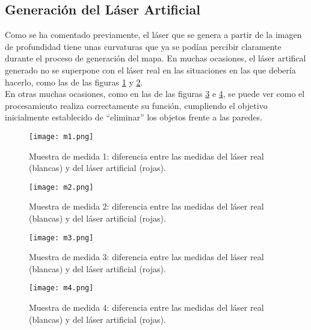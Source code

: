 \subsection{Generación del Láser Artificial}

Como se ha comentado previamente, el láser que se genera a partir de la imagen de profundidad tiene unas curvaturas que ya se podían percibir claramente durante el proceso de generación del mapa. En muchas ocasiones, el láser artifical generado no se superpone con el láser real en las situaciones en las que debería hacerlo, como las de las figuras \ref{fig:m1} y \ref{fig:m2}.\\

En otras muchas ocasiones, como en las de las figuras \ref{fig:m3} e \ref{fig:m4}, se puede ver como el procesamiento realiza correctamente su función, cumpliendo el objetivo inicialmente establecido de ``eliminar'' los objetos frente a las paredes.\\

\begin{figure}[H]
	\begin{center} 
		\texttt{[image: m1.png]}
	\end{center}
	\caption{Muestra de medida 1: diferencia entre las medidas del láser real (blancas) y del láser artificial (rojas).}
	\label{fig:m1}
\end{figure}

\begin{figure}[H]
	\begin{center} 
		\texttt{[image: m2.png]}
	\end{center}
	\caption{Muestra de medida 2: diferencia entre las medidas del láser real (blancas) y del láser artificial (rojas).}
	\label{fig:m2}
\end{figure}

\begin{figure}[H]
	\begin{center} 
		\texttt{[image: m3.png]}
	\end{center}
	\caption{Muestra de medida 3: diferencia entre las medidas del láser real (blancas) y del láser artificial (rojas).}
	\label{fig:m3}
\end{figure}

\begin{figure}[H]
	\begin{center} 
		\texttt{[image: m4.png]}
	\end{center}
	\caption{Muestra de medida 4: diferencia entre las medidas del láser real (blancas) y del láser artificial (rojas).}
	\label{fig:m4}
\end{figure}

